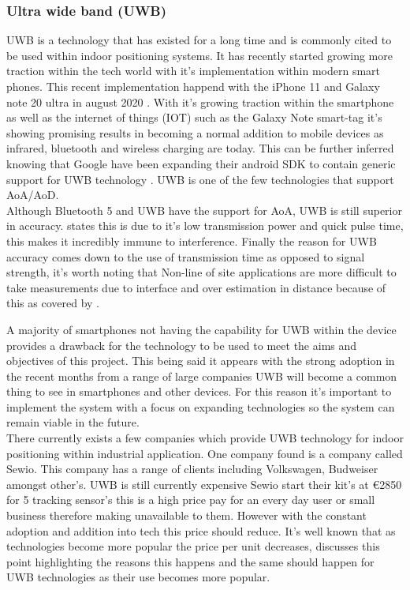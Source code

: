 \subsubsection{Ultra wide band (UWB)}
UWB is a technology that has existed for a long time and is commonly cited to be used within indoor positioning systems. It has recently started growing more traction within the tech world with it's implementation within modern smart phones. This recent implementation happend with the iPhone 11 and Galaxy note 20 ultra in august 2020 \citetemp. With it's growing traction within the smartphone as well as the internet of things (IOT) such as the Galaxy Note smart-tag \citetemp it's showing promising results in becoming a normal addition to mobile devices as infrared, bluetooth and wireless charging are today. This can be further inferred knowing that Google have been expanding their android SDK  to contain generic support for UWB technology \citetemp. UWB is one of the few technologies that support AoA/AoD.\\ Although Bluetooth 5 and UWB have the support for AoA, UWB is still superior in accuracy. \citetemp states this is due to it's low transmission power and quick pulse time, this makes it incredibly immune to interference. Finally the reason for UWB accuracy comes down to the use of transmission time as opposed to signal strength, it's worth noting that Non-line of site applications are more difficult to take measurements due to interface and over estimation in distance because of this as covered by \citetemp. 

A majority of smartphones not having the capability for UWB within the device provides a drawback for the technology to be used to meet the aims and objectives of this project. This being said it appears with the strong adoption in the recent months from a range of large companies UWB will become a common thing to see in smartphones and other devices. For this reason it's important to implement the system with a focus on expanding technologies so the system can remain viable in the future.\\

There currently exists a few companies which provide UWB technology for indoor positioning within industrial application. One company found is a company called Sewio. This company has a range of clients including Volkswagen, Budweiser amongst other’s. UWB is still currently expensive Sewio start their kit's at €2850 for 5 tracking sensor's this is a high price pay for an every day user or small business therefore making unavailable to them. However with the constant adoption and addition into tech this price should reduce. It's well known that as technologies become more popular the price per unit decreases, \citetemp discusses this point highlighting the reasons this happens and the same should happen for UWB technologies as their use becomes more popular.


